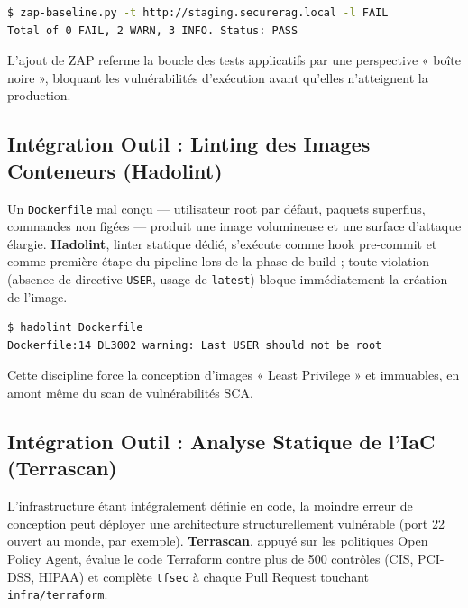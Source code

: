 \begin{lstlisting}[language=bash, caption={Exécution du scan ZAP Baseline dans le pipeline CI}, label={lst:zap_proof}]
$ zap-baseline.py -t http://staging.securerag.local -l FAIL
Total of 0 FAIL, 2 WARN, 3 INFO. Status: PASS
\end{lstlisting}

L'ajout de ZAP referme la boucle des tests applicatifs par une perspective « boîte noire », bloquant les vulnérabilités d'exécution avant qu'elles n'atteignent la production.

\subsection{Intégration Outil : Linting des Images Conteneurs (Hadolint)}

Un \texttt{Dockerfile} mal conçu — utilisateur root par défaut, paquets superflus, commandes non figées — produit une image volumineuse et une surface d'attaque élargie. \textbf{Hadolint}, linter statique dédié, s'exécute comme hook pre-commit et comme première étape du pipeline lors de la phase de build ; toute violation (absence de directive \texttt{USER}, usage de \texttt{latest}) bloque immédiatement la création de l'image.

\begin{lstlisting}[language=bash, caption={Vérification du Dockerfile par Hadolint}, label={lst:hadolint_proof}]
$ hadolint Dockerfile
Dockerfile:14 DL3002 warning: Last USER should not be root
\end{lstlisting}

Cette discipline force la conception d'images « Least Privilege » et immuables, en amont même du scan de vulnérabilités SCA.

\subsection{Intégration Outil : Analyse Statique de l'IaC (Terrascan)}

L'infrastructure étant intégralement définie en code, la moindre erreur de conception peut déployer une architecture structurellement vulnérable (port 22 ouvert au monde, par exemple). \textbf{Terrascan}, appuyé sur les politiques Open Policy Agent, évalue le code Terraform contre plus de 500 contrôles (CIS, PCI-DSS, HIPAA) et complète \texttt{tfsec} à chaque Pull Request touchant \texttt{infra/terraform}.


